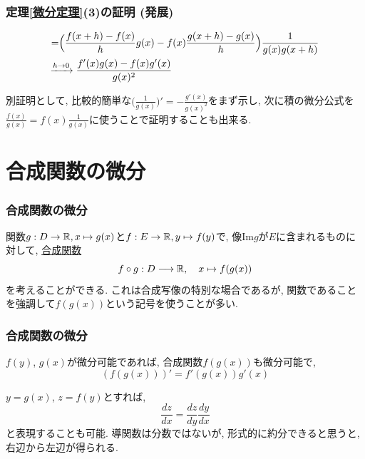 

\begin{frame}
\frametitle{定理\ref{微分定理}(3)の証明 (発展)}


\begin{align*}
=& 
\Big(
\frac{f(x+h)-f(x)}{h} g(x)- f(x)\frac{g(x+h)-g(x)}{h}
\Big) \frac{1}{g(x)g(x+h)}
\\
& \hspace{-4mm} \xrightarrow{h \to 0} 
\frac{f'(x)g(x)-f(x)g'(x)}{g(x)^2}
\end{align*}

別証明として, 比較的簡単な$\Big(\frac{1}{g(x)}\Big)'=-\frac{g'(x)}{g(x)^2}$をまず示し, 
次に積の微分公式を$\frac{f(x)}{g(x)}=f(x) \frac{1}{g(x)}$に使うことで証明することも出来る. 

\end{frame}




\section{合成関数の微分}

\begin{frame}
\frametitle{合成関数の微分}

関数$g:D \rightarrow \mathbb{R}, x\mapsto g(x)$と$f:E\rightarrow \mathbb{R}, y\mapsto f(y)$で, 像$\mathrm{Im}g$が$E$に含まれるものに対して, 
\underline{合成関数}
$$
f\circ g:D \longrightarrow \mathbb{R}, \ \ \ x \mapsto f(g(x))
$$
を考えることができる. 
これは合成写像の特別な場合であるが, 関数であることを強調して$f(g(x))$という記号を使うことが多い. 


\end{frame}




\begin{frame}
\frametitle{合成関数の微分}


\begin{Thm} \label{合成関数}
$f(y)$, $g(x)$が微分可能であれば, 合成関数$f(g(x))$も微分可能で, 
$$
(f(g(x)))'=f'(g(x))g'(x)
$$
\end{Thm}
$y=g(x)$, $z=f(y)$とすれば, 
$$
\frac{dz}{dx}=\frac{dz}{dy} \frac{dy}{dx}
$$
と表現することも可能. 
導関数は分数ではないが, 形式的に約分できると思うと, 右辺から左辺が得られる. 

\end{frame}


